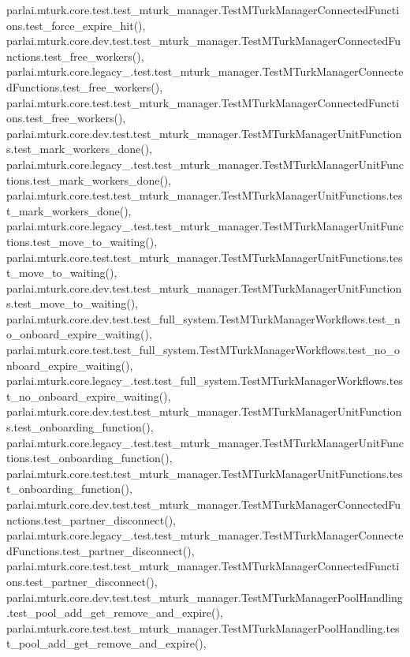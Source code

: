 parlai.\+mturk.\+core.\+test.\+test\+\_\+mturk\+\_\+manager.\+Test\+M\+Turk\+Manager\+Connected\+Functions.\+test\+\_\+force\+\_\+expire\+\_\+hit(), parlai.\+mturk.\+core.\+dev.\+test.\+test\+\_\+mturk\+\_\+manager.\+Test\+M\+Turk\+Manager\+Connected\+Functions.\+test\+\_\+free\+\_\+workers(), parlai.\+mturk.\+core.\+legacy\+\_.\+test.\+test\+\_\+mturk\+\_\+manager.\+Test\+M\+Turk\+Manager\+Connected\+Functions.\+test\+\_\+free\+\_\+workers(), parlai.\+mturk.\+core.\+test.\+test\+\_\+mturk\+\_\+manager.\+Test\+M\+Turk\+Manager\+Connected\+Functions.\+test\+\_\+free\+\_\+workers(), parlai.\+mturk.\+core.\+dev.\+test.\+test\+\_\+mturk\+\_\+manager.\+Test\+M\+Turk\+Manager\+Unit\+Functions.\+test\+\_\+mark\+\_\+workers\+\_\+done(), parlai.\+mturk.\+core.\+legacy\+\_.\+test.\+test\+\_\+mturk\+\_\+manager.\+Test\+M\+Turk\+Manager\+Unit\+Functions.\+test\+\_\+mark\+\_\+workers\+\_\+done(), parlai.\+mturk.\+core.\+test.\+test\+\_\+mturk\+\_\+manager.\+Test\+M\+Turk\+Manager\+Unit\+Functions.\+test\+\_\+mark\+\_\+workers\+\_\+done(), parlai.\+mturk.\+core.\+legacy\+\_.\+test.\+test\+\_\+mturk\+\_\+manager.\+Test\+M\+Turk\+Manager\+Unit\+Functions.\+test\+\_\+move\+\_\+to\+\_\+waiting(), parlai.\+mturk.\+core.\+test.\+test\+\_\+mturk\+\_\+manager.\+Test\+M\+Turk\+Manager\+Unit\+Functions.\+test\+\_\+move\+\_\+to\+\_\+waiting(), parlai.\+mturk.\+core.\+dev.\+test.\+test\+\_\+mturk\+\_\+manager.\+Test\+M\+Turk\+Manager\+Unit\+Functions.\+test\+\_\+move\+\_\+to\+\_\+waiting(), parlai.\+mturk.\+core.\+dev.\+test.\+test\+\_\+full\+\_\+system.\+Test\+M\+Turk\+Manager\+Workflows.\+test\+\_\+no\+\_\+onboard\+\_\+expire\+\_\+waiting(), parlai.\+mturk.\+core.\+test.\+test\+\_\+full\+\_\+system.\+Test\+M\+Turk\+Manager\+Workflows.\+test\+\_\+no\+\_\+onboard\+\_\+expire\+\_\+waiting(), parlai.\+mturk.\+core.\+legacy\+\_.\+test.\+test\+\_\+full\+\_\+system.\+Test\+M\+Turk\+Manager\+Workflows.\+test\+\_\+no\+\_\+onboard\+\_\+expire\+\_\+waiting(), parlai.\+mturk.\+core.\+dev.\+test.\+test\+\_\+mturk\+\_\+manager.\+Test\+M\+Turk\+Manager\+Unit\+Functions.\+test\+\_\+onboarding\+\_\+function(), parlai.\+mturk.\+core.\+legacy\+\_.\+test.\+test\+\_\+mturk\+\_\+manager.\+Test\+M\+Turk\+Manager\+Unit\+Functions.\+test\+\_\+onboarding\+\_\+function(), parlai.\+mturk.\+core.\+test.\+test\+\_\+mturk\+\_\+manager.\+Test\+M\+Turk\+Manager\+Unit\+Functions.\+test\+\_\+onboarding\+\_\+function(), parlai.\+mturk.\+core.\+dev.\+test.\+test\+\_\+mturk\+\_\+manager.\+Test\+M\+Turk\+Manager\+Connected\+Functions.\+test\+\_\+partner\+\_\+disconnect(), parlai.\+mturk.\+core.\+legacy\+\_.\+test.\+test\+\_\+mturk\+\_\+manager.\+Test\+M\+Turk\+Manager\+Connected\+Functions.\+test\+\_\+partner\+\_\+disconnect(), parlai.\+mturk.\+core.\+test.\+test\+\_\+mturk\+\_\+manager.\+Test\+M\+Turk\+Manager\+Connected\+Functions.\+test\+\_\+partner\+\_\+disconnect(), parlai.\+mturk.\+core.\+dev.\+test.\+test\+\_\+mturk\+\_\+manager.\+Test\+M\+Turk\+Manager\+Pool\+Handling.\+test\+\_\+pool\+\_\+add\+\_\+get\+\_\+remove\+\_\+and\+\_\+expire(), parlai.\+mturk.\+core.\+test.\+test\+\_\+mturk\+\_\+manager.\+Test\+M\+Turk\+Manager\+Pool\+Handling.\+test\+\_\+pool\+\_\+add\+\_\+get\+\_\+remove\+\_\+and\+\_\+expire(), 
